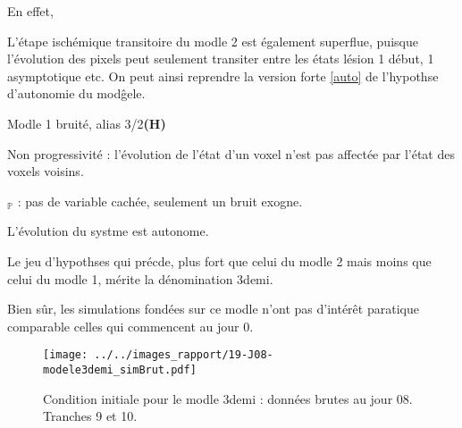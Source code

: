 \par
En effet, 

\par
L'\'etape isch\'emique transitoire du modle 2 est \'egalement superflue, %
puisque l'\'evolution des pixels peut seulement transiter entre les \'etats l\'esion 1 d\'ebut, 1 asymptotique etc. %
On peut ainsi reprendre la version forte \ref{auto} de l'hypothse d'autonomie du mod\^g{e}le.

\begin{modmerate}{Modle 1 bruit\'e, alias \og{} 3/2\fg{}}{\textbf{(H\arabic*)}}
\item Non progressivit\'e : l'\'evolution de l'\'etat d'un voxel n'est pas affect\'ee par l'\'etat des voxels voisins.
\item ${}_\mathbb{P}$ : pas de variable cach\'ee, seulement un bruit exogne.
\item L'\'evolution du systme est autonome.
\end{modmerate}

Le jeu d'hypothses qui pr\'ecde, plus fort que celui du modle 2 mais moins que celui du modle 1, m\'erite la d\'enomination \og{} 3demi\fg{}.

\etoile
Bien s\^ur, les simulations fond\'ees sur ce modle n'ont pas d'int\'er\^et paratique comparable  celles qui commencent au jour 0. %


\begin{figure}[!p]
\begin{center}
\texttt{[image: ../../images\_rapport/19-J08-modele3demi\_simBrut.pdf]}
\end{center}
\caption{Condition initiale pour le modle 3demi : donn\'ees brutes au jour 08. Tranches 9 et 10.}
\label{sim_ini_18}
\end{figure}









